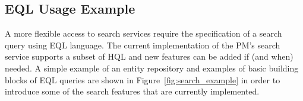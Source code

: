 %
%


\subsection{EQL Usage Example}

A more flexible access to search services require the specification of a search query using EQL language. The current implementation of the PM's search service supports a subset of HQL and new features can be added if (and when) needed. A simple example of an entity repository and examples of basic building blocks of EQL queries are shown in Figure~\ref{fig:search_example} in order to introduce some of the search features that are currently implemented. 


